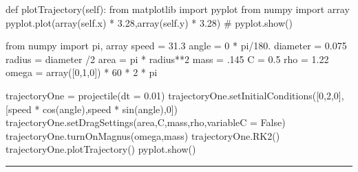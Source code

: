 \begin{enumerate}
\begin{codeexample}
\begin{VerbatimOut}{\listingFile}
    def plotTrajectory(self):
        from matplotlib import pyplot
        from numpy import array
        pyplot.plot(array(self.x) * 3.28,array(self.y) * 3.28)
        # pyplot.show()


from numpy import pi, array
speed = 31.3
angle = 0 * pi/180.
diameter = 0.075
radius = diameter /2
area = pi * radius**2
mass = .145
C = 0.5
rho = 1.22
omega = array([0,1,0]) * 60 * 2 * pi

trajectoryOne = projectile(dt = 0.01)
trajectoryOne.setInitialConditions([0,2,0],[speed * cos(angle),speed * sin(angle),0])
trajectoryOne.setDragSettings(area,C,mass,rho,variableC = False)
trajectoryOne.turnOnMagnus(omega,mass)
trajectoryOne.RK2()
trajectoryOne.plotTrajectory()
pyplot.show()
\end{VerbatimOut}
\end{codeexample}
\else
\noindent\rule{4 in}{0.01 in}
\fi

\end{enumerate}

